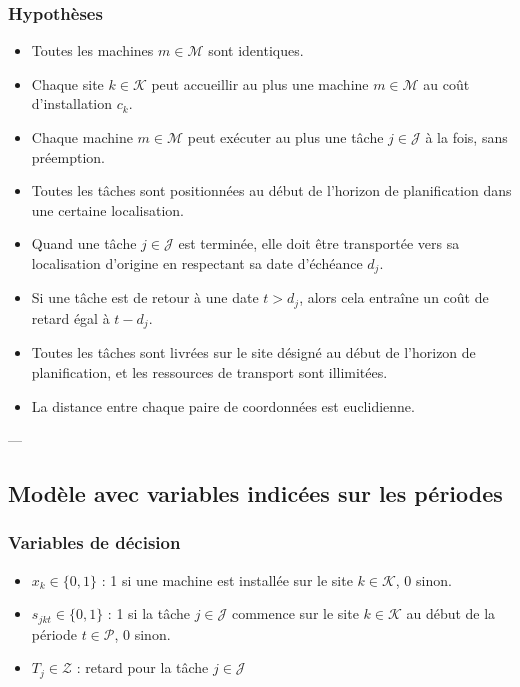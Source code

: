 \subsubsection{Hypothèses}
\begin{itemize}
    \item Toutes les machines \(m \in \mathcal{M}\) sont identiques.
    \item Chaque site \(k \in \mathcal{K}\) peut accueillir au plus une machine \(m \in \mathcal{M}\) au coût d'installation \(c_{k}\).
    \item Chaque machine \(m \in \mathcal{M}\) peut exécuter au plus une tâche \(j \in \mathcal{J}\) à la fois, sans préemption.
    \item Toutes les tâches sont positionnées au début de l'horizon de planification dans une certaine localisation.
    \item Quand une tâche \(j \in \mathcal{J}\) est terminée, elle doit être transportée vers sa localisation d'origine en respectant sa date d'échéance \(d_{j}\).
    \item Si une tâche est de retour à une date \(t > d_{j}\), alors cela entraîne un coût de retard égal à \(t - d_{j}\).
    \item Toutes les tâches sont livrées sur le site désigné au début de l'horizon de planification, et les ressources de transport sont illimitées.
    \item La distance entre chaque paire de coordonnées est euclidienne.
\end{itemize}

---

\subsection{Modèle avec variables indicées sur les périodes}

\subsubsection{Variables de décision}
\begin{itemize}
    \item \(x_{k} \in \{0, 1\}\) : 1 si une machine est installée sur le site \(k \in \mathcal{K}\), 0 sinon.
    \item \(s_{jkt} \in \{0, 1\}\) : 1 si la tâche \(j \in \mathcal{J}\) commence sur le site \(k \in \mathcal{K}\) au début de la période \(t \in \mathcal{P}\), 0 sinon.
    \item \(T_{j} \in \mathcal{Z}\) : retard pour la tâche \(j \in \mathcal{J}\)
\end{itemize}

